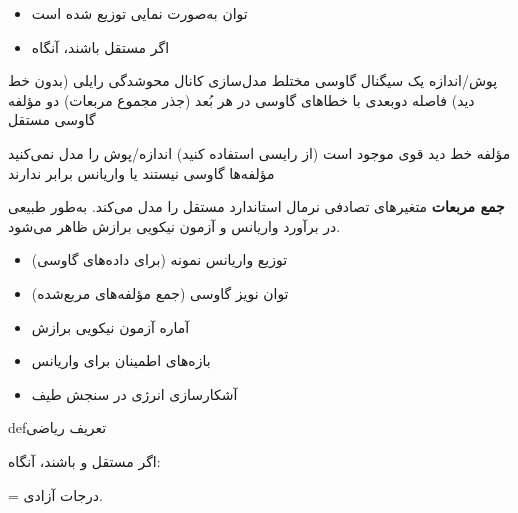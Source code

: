 

\begin{itemize}
\tightlist
\item
    توان به‌صورت نمایی توزیع شده است
\item
  اگر  مستقل باشند، آنگاه 
\end{itemize}


\lr{\mbox{\PSyes{}}} پوش/اندازه یک سیگنال گاوسی مختلط\PSbr{}\lr{\mbox{\PSyes{}}} مدل‌سازی کانال محوشدگی رایلی (بدون خط دید)\PSbr{}\lr{\mbox{\PSyes{}}} فاصله دوبعدی با خطاهای گاوسی در هر بُعد\PSbr{} (جذر مجموع مربعات) دو مؤلفه گاوسی مستقل


\lr{\mbox{\PSno{}}} مؤلفه خط دید قوی موجود است (از رایسی استفاده کنید)\PSbr{}\lr{\mbox{\PSno{}}} اندازه/پوش را مدل نمی‌کنید\PSbr{}\lr{\mbox{\PSno{}}} مؤلفه‌ها گاوسی نیستند یا واریانس برابر ندارند



\textbf{جمع مربعات} متغیرهای تصادفی نرمال استاندارد مستقل را مدل می‌کند. به‌طور طبیعی در برآورد واریانس و آزمون نیکویی برازش ظاهر می‌شود.


\begin{itemize}
\tightlist
\item
  توزیع واریانس نمونه (برای داده‌های گاوسی)
\item
  توان نویز گاوسی (جمع مؤلفه‌های مربع‌شده)
\item
  آماره آزمون نیکویی برازش
\item
  بازه‌های اطمینان برای واریانس
\item
  آشکارسازی انرژی در سنجش طیف
\end{itemize}

\begin{PSbox}[unbreakable]{def}{تعریف ریاضی}

اگر  مستقل و  باشند، آنگاه:

 = درجات آزادی.

\end{PSbox}

